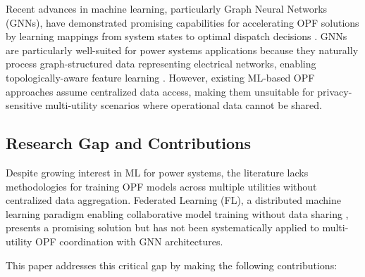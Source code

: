 \documentclass[journal,10pt]{IEEEtran}
\begin{document}
Recent advances in machine learning, particularly Graph Neural Networks (GNNs), have demonstrated promising capabilities for accelerating OPF solutions by learning mappings from system states to optimal dispatch decisions \cite{huang2023physics, lei2023topology}. GNNs are particularly well-suited for power systems applications because they naturally process graph-structured data representing electrical networks, enabling topologically-aware feature learning \cite{kipf2017semi, hamilton2017inductive}. However, existing ML-based OPF approaches assume centralized data access, making them unsuitable for privacy-sensitive multi-utility scenarios where operational data cannot be shared.

\subsection{Research Gap and Contributions}

Despite growing interest in ML for power systems, the literature lacks methodologies for training OPF models across multiple utilities without centralized data aggregation. Federated Learning (FL), a distributed machine learning paradigm enabling collaborative model training without data sharing \cite{mcmahan2017communication}, presents a promising solution but has not been systematically applied to multi-utility OPF coordination with GNN architectures.

This paper addresses this critical gap by making the following contributions:
\end{document}

